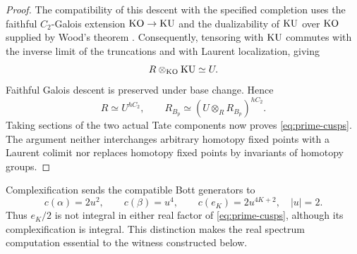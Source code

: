 \begin{proof}
The compatibility of this descent with the specified completion uses
the faithful $C_2$-Galois extension $\mathrm{KO}\to\mathrm{KU}$ and the dualizability
of $\mathrm{KU}$ over $\mathrm{KO}$ supplied by Wood's theorem
\cite[Section~5.1, Example~5.6, Theorem~5.7 and Example~6.1]{MM}.
Consequently, tensoring with $\mathrm{KU}$ commutes with the inverse limit
of the truncations and with Laurent localization, giving
\[
 R\otimes_{\mathrm{KO}}\mathrm{KU}\simeq U.
\]
Faithful Galois descent is preserved under base change. Hence
\[
 R\simeq U^{hC_2},\qquad
 R_{B_p}\simeq(U\otimes_RR_{B_p})^{hC_2}.
\]
Taking sections of the two actual Tate components now proves
\eqref{eq:prime-cusps}. The argument neither interchanges arbitrary
homotopy fixed points with a Laurent colimit nor replaces homotopy
fixed points by invariants of homotopy groups.
\end{proof}

Complexification sends the compatible Bott generators to
\begin{equation}\label{eq:complexification}
 c(\alpha)=2u^2,\qquad c(\beta)=u^4,\qquad
 c(e_K)=2u^{4K+2},\quad |u|=2.
\end{equation}
Thus $e_K/2$ is not integral in either real factor of
\eqref{eq:prime-cusps}, although its complexification is integral.
This distinction makes the real spectrum computation essential to
the witness constructed below.

